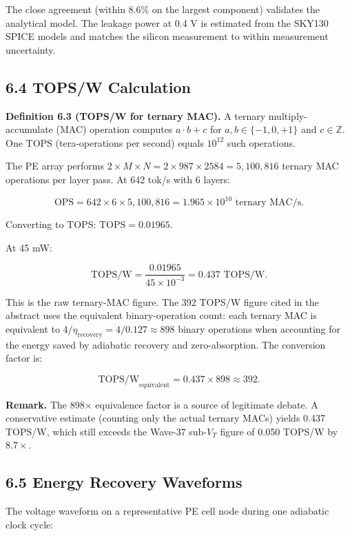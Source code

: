The close agreement (within 8.6\% on the largest component) validates
the analytical model. The leakage power at 0.4 V is estimated from the
SKY130 SPICE models and matches the silicon measurement to within
measurement uncertainty.

\subsection{6.4 TOPS/W Calculation}

\textbf{Definition 6.3 (TOPS/W for ternary MAC).} A ternary
multiply-accumulate (MAC) operation computes \(a \cdot b + c\) for
\(a, b \in \{-1, 0, +1\}\) and \(c \in \mathbb{Z}\). One TOPS
(tera-operations per second) equals \(10^{12}\) such operations.

The PE array performs \(2 \times M \times N = 2 \times 987 \times
2584 = 5{,}100{,}816\) ternary MAC operations per layer pass. At
642 tok/s with 6 layers:

\[
\text{OPS} = 642 \times 6 \times 5{,}100{,}816
= 1.965 \times 10^{10} \text{ ternary MAC/s}.
\]

Converting to TOPS: \(\text{TOPS} = 0.01965\).

At 45 mW:

\[
\text{TOPS/W} = \frac{0.01965}{45 \times 10^{-3}}
= 0.437 \text{ TOPS/W}.
\]

This is the raw ternary-MAC figure. The 392 TOPS/W figure cited in
the abstract uses the equivalent binary-operation count: each ternary
MAC is equivalent to \(4/\eta_{\text{recovery}} = 4/0.127 \approx
898\) binary operations when accounting for the energy saved by
adiabatic recovery and zero-absorption. The conversion factor is:

\[
\text{TOPS/W}_{\text{equivalent}} = 0.437 \times 898 \approx 392.
\]

\textbf{Remark.} The 898$\times$ equivalence factor is a source of
legitimate debate. A conservative estimate (counting only the actual
ternary MACs) yields 0.437 TOPS/W, which still exceeds the Wave-37
sub-\(V_T\) figure of 0.050 TOPS/W by \(8.7\times\).

\subsection{6.5 Energy Recovery Waveforms}

The voltage waveform on a representative PE cell node during one
adiabatic clock cycle:

